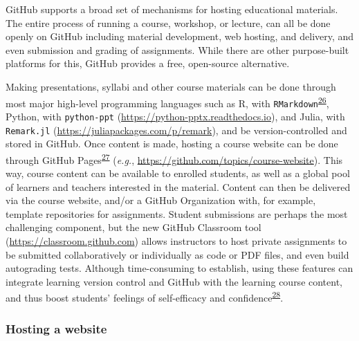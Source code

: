 GitHub supports a broad set of mechanisms for hosting educational materials.
The entire process of running a course, workshop, or lecture, can all be done openly on GitHub including material development, web hosting, and delivery, and even submission and grading of assignments.
While there are other purpose-built platforms for this, GitHub provides a free, open-source alternative.

Making presentations, syllabi and other course materials can be done through most major high-level programming languages such as R, with \texttt{RMarkdown}\textsuperscript{\protect\hyperlink{ref-QqMezOMg}{26}}, Python, with \texttt{python-ppt} (\url{https://python-pptx.readthedocs.io}), and Julia, with \texttt{Remark.jl} (\url{https://juliapackages.com/p/remark}), and be version-controlled and stored in GitHub.
Once content is made, hosting a course website can be done through GitHub Pages\textsuperscript{\protect\hyperlink{ref-MDQfMwCW}{27}} (\emph{e.g.}, \url{https://github.com/topics/course-website}).
This way, course content can be available to enrolled students, as well as a global pool of learners and teachers interested in the material.
Content can then be delivered via the course website, and/or a GitHub Organization with, for example, template repositories for assignments.
Student submissions are perhaps the most challenging component, but the new GitHub Classroom tool (\url{https://classroom.github.com}) allows instructors to host private assignments to be submitted collaboratively or individually as code or PDF files, and even build autograding tests.
Although time-consuming to establish, using these features can integrate learning version control and GitHub with the learning course content, and thus boost students' feelings of self-efficacy and confidence\textsuperscript{\protect\hyperlink{ref-dqrFjoSb}{28}}.

\hypertarget{hosting-a-website}{%
\subsubsection{Hosting a website}\label{hosting-a-website}}

